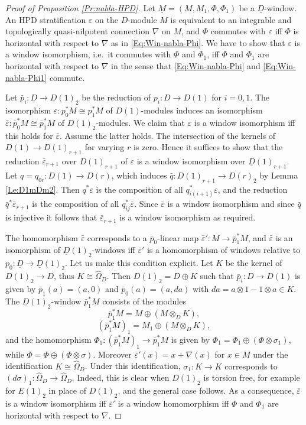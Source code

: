 \documentclass[a4paper,11pt]{article}
\theoremstyle{plain}
\theoremstyle{definition}
\theoremstyle{remark}
\theoremstyle{definition}
\numberwithin{Lemma}{section}
\numberwithin{Subpoint}{Lemma}
\numberwithin{equation}{section}
\renewcommand{\u}{\underline}
\newcommand{\chang}[1]{{#1}}
\begin{document}
\begin{proof}[Proof of Proposition \ref{Pr:nabla-HPD}]
Let $\u M=(M, M_1,\Phi,\Phi_1)$ be a $\u D$-window.
An HPD stratification $\varepsilon$ on the $D$-module $M$ is equivalent to
an integrable and topologically quasi-nilpotent connection $\nabla$ on $M$,
and $\Phi$ commutes with $\varepsilon$ iff $\Phi$ is horizontal \chang{with respect to}
$\nabla$ as in \eqref{Eq:Win-nabla-Phi}. 
We have to show that $\varepsilon$ is a window isomorphism, 
i.e.\ it commutes with $\Phi$ and $\Phi_1$,
iff $\Phi$ and $\Phi_1$ are horizontal \chang{with respect to} $\nabla$ in the sense that
\eqref{Eq:Win-nabla-Phi} and \eqref{Eq:Win-nabla-Phi1} commute.

Let $\bar p_i:\u D\to\u D(1)_2$ be the reduction of $p_i:D\to D(1)$ for $i=0,1$.
The isomorphism $\varepsilon:p_0^*M\cong p_1^*M$ 
of $D(1)$-modules induces an isomorphism
$\bar\varepsilon:\bar p_0^*M\cong\bar p_1^*M$ of $D(1)_2$-modules.
We claim that $\varepsilon$ is a window isomorphism iff this holds for 
$\bar\varepsilon$. Assume the latter holds.
The intersection of the kernels of $D(1)\to D(1)_{r+1}$ 
for varying $r$ is zero.
Hence it suffices to show that the reduction $\bar\varepsilon_{r+1}$ over $D(1)_{r+1}$
of $\varepsilon$ is a window isomorphism over $\u D(1)_{r+1}$.
Let $q=q_{0r}:D(1)\to D(r)$,
which induces $\bar q:D(1)_{r+1}\to D(r)_2$ by Lemma \ref{Le:D1mDm2}.
Then $q^*\varepsilon$ is the composition of all $q_{i(i+1)}^*\varepsilon$,
and the reduction $\bar q^*\bar\varepsilon_{r+1}$
is the composition of all $q_{ij}^*\bar\varepsilon$.
Since $\bar\varepsilon$ is a window isomorphism and since $\bar q$ is
injective it follows that $\bar\varepsilon_{r+1}$ is a window isomorphism
as required.

The homomorphism $\bar\varepsilon$ 
corresponds to a $\bar p_0$-linear map $\bar\varepsilon':M\to\bar p_1^*M$,
and $\bar\varepsilon$ is an isomorphism of $\u D(1)_2$-windows iff
$\bar\varepsilon'$ is a homomorphism of windows relative to 
$p_0:\u D\to\u D(1)_2$.
Let us make this condition explicit.
Let $K$ be the kernel of $D(1)_2\to D$,
thus $K\cong\hat\Omega_D$.
Then $D(1)_2=D\oplus K$ 
\chang{such that $\bar p_i:D\to D(1)$ is given by $\bar p_1(a)=(a,0)$ and}
$\bar p_0(a)=(a,da)$ with $da=a\otimes1-1\otimes a\in K$.
The $\u D(1)_2$-window $\bar p_1^*\u M$ consists of the modules
\chang
{\[
\bar p_1^*M=M\oplus (M\otimes_{D}K),
\]
\[
(\bar p_1^*M)_1= M_1\oplus (M\otimes_{D}K),
\]}
and the homomorphism $\Phi_1:(\bar p_1^*M)_1\to\bar p_1^*M$
is given by $\Phi_1=\Phi_1\oplus(\Phi\otimes\sigma_1)$,
while $\Phi=\Phi\oplus(\Phi\otimes\sigma)$.
Moreover $\bar\varepsilon'(x)=x+\nabla(x)$ 
for $x\in M$ under the identification $K\cong\hat\Omega_D$.
Under this identification, 
\chang{$\sigma_1:K\to K$ corresponds to
$(d\sigma)_1:\hat\Omega_D\to\hat\Omega_D$.}
Indeed, this is clear when $D(1)_2$ is torsion free,
for example for $E(1)_2$ in place of $D(1)_2$,
and the general case follows.
As a consequence, $\bar\varepsilon$ is a window isomorphism
iff $\bar\varepsilon'$ is a window homomorphism
iff $\Phi$ and $\Phi_1$ are horizontal \chang{with respect to} $\nabla$.
\end{proof}
\end{document}
